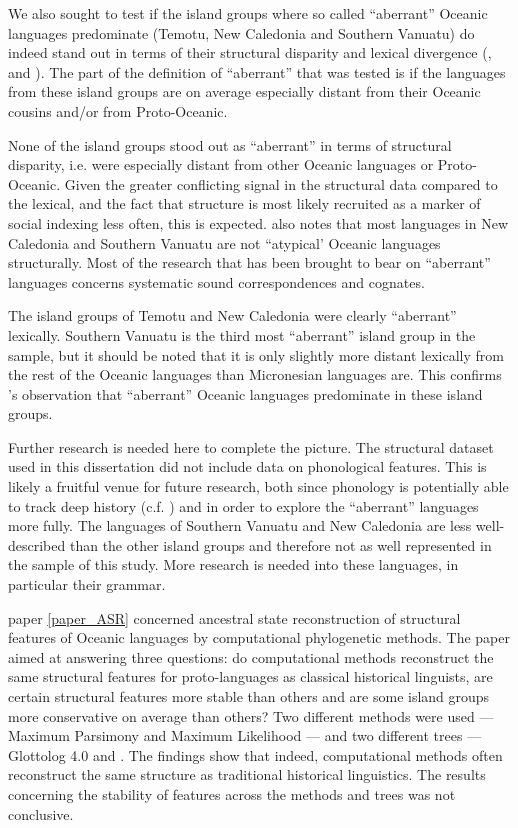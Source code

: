 \documentclass[a4paper,10pt]{article} %
\begin{document}
We also sought to test if the island groups where so called ``aberrant'' Oceanic languages predominate (Temotu, New Caledonia and Southern Vanuatu) do indeed stand out in terms of their structural disparity and lexical divergence (\citet{grace1981indirect}, \citet{grace_1992_aberrant} and \citet{pawley2006explaining}). The part of the definition of ``aberrant'' that was tested is if the languages from these island groups are on average especially distant from their Oceanic cousins and/or from Proto-Oceanic. 

None of the island groups stood out as ``aberrant'' in terms of structural disparity, i.e. were especially distant from other Oceanic languages or Proto-Oceanic. Given the greater conflicting signal in the structural data compared to the lexical, and the fact that structure is most likely recruited as a marker of social indexing less often, this is expected. \citet[219]{pawley2006explaining} also notes that most languages in New Caledonia and Southern Vanuatu are not ``atypical' Oceanic languages structurally. Most of the research that has been brought to bear on ``aberrant'' languages concerns systematic sound correspondences and cognates.

The island groups of Temotu and New Caledonia were clearly ``aberrant'' lexically. Southern Vanuatu is the third most ``aberrant'' island group in the sample, but it should be noted that it is only slightly more distant lexically from the rest of the Oceanic languages than Micronesian languages are. This confirms \citet{pawley2006explaining}'s observation that ``aberrant'' Oceanic languages predominate in these island groups.

Further research is needed here to complete the picture. The structural dataset used in this dissertation did not include data on phonological features. This is likely a fruitful venue for future research, both since phonology is potentially able to track deep history (c.f. \cite{evansaustralia_2019}) and in order to explore the ``aberrant'' languages more fully. The languages of Southern Vanuatu and New Caledonia are less well-described than the other island groups and therefore not as well represented in the sample of this study. More research is needed into these languages, in particular their grammar.

paper \ref{paper_ASR} concerned ancestral state reconstruction of structural features of Oceanic languages by computational phylogenetic methods. The paper aimed at answering three questions: do computational methods reconstruct the same structural features for proto-languages as classical historical linguists, are certain structural features more stable than others and are some island groups more conservative on average than others? Two different methods were used --- Maximum Parsimony and Maximum Likelihood --- and two different trees --- Glottolog 4.0 \citep{glottolog40} and \citet{grayetal_2009}. The findings show that indeed, computational methods often reconstruct the same structure as traditional historical linguistics. The results concerning the stability of features across the methods and trees was not conclusive. 
\end{document}
